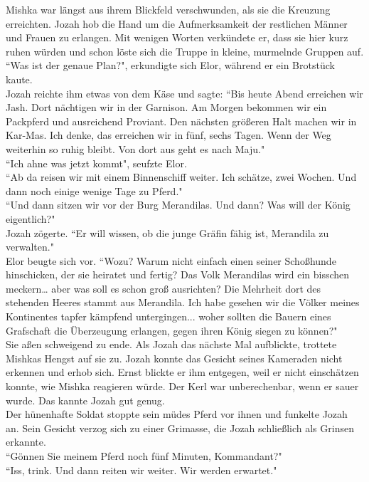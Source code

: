 Mishka war längst aus ihrem Blickfeld verschwunden, als sie die Kreuzung erreichten. Jozah hob die 
Hand um die Aufmerksamkeit der restlichen Männer und Frauen zu erlangen. Mit wenigen Worten 
verkündete er, dass sie hier kurz ruhen würden und schon löste sich die Truppe in kleine, murmelnde 
Gruppen auf. \\ 
``Was ist der genaue Plan?", erkundigte sich Elor, während er ein Brotstück kaute. \\
Jozah reichte ihm etwas von dem Käse und sagte: ``Bis heute Abend erreichen wir Jash. Dort 
nächtigen wir in der Garnison. Am Morgen bekommen wir ein Packpferd und ausreichend Proviant. Den 
nächsten größeren Halt machen wir in Kar-Mas. Ich denke, das erreichen wir in fünf, sechs Tagen. 
Wenn der Weg weiterhin so ruhig bleibt. Von dort aus geht es nach Maju."\\
``Ich ahne was jetzt kommt", seufzte Elor.\\
``Ab da reisen wir mit einem Binnenschiff weiter. Ich schätze, zwei Wochen. Und dann noch einige 
wenige Tage zu Pferd."\\
``Und dann sitzen wir vor der Burg Merandilas. Und dann? Was will der König eigentlich?"\\
Jozah zögerte. ``Er will wissen, ob die junge Gräfin fähig ist, Merandila zu verwalten."\\
Elor beugte sich vor. ``Wozu? Warum nicht einfach einen seiner Schoßhunde hinschicken, der sie 
heiratet und fertig? Das Volk Merandilas wird ein bisschen meckern… aber was soll es schon groß 
ausrichten? Die Mehrheit dort des stehenden Heeres stammt aus Merandila. Ich habe gesehen wir die 
Völker meines Kontinentes tapfer kämpfend untergingen... woher sollten die Bauern eines Grafschaft 
die Überzeugung erlangen, gegen ihren König siegen zu können?"\\
Sie aßen schweigend zu ende. Als Jozah das nächste Mal aufblickte, trottete Mishkas Hengst auf sie 
zu. Jozah konnte das Gesicht seines Kameraden nicht erkennen und erhob sich. Ernst blickte er ihm 
entgegen, weil er nicht einschätzen konnte, wie Mishka reagieren würde. Der Kerl war unberechenbar, 
wenn er sauer wurde. Das kannte Jozah gut genug.\\
Der hünenhafte Soldat stoppte sein müdes Pferd vor ihnen und funkelte Jozah an. Sein Gesicht verzog 
sich zu einer Grimasse, die Jozah schließlich als Grinsen erkannte. \\
``Gönnen Sie meinem Pferd noch fünf Minuten, Kommandant?"\\
``Iss, trink. Und dann reiten wir weiter. Wir werden erwartet."\\

